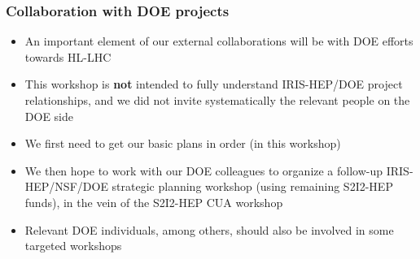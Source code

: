 \begin{frame}
\frametitle{Collaboration with DOE projects}

\begin{itemize}
\item An important element of our external collaborations will be with DOE efforts towards HL-LHC
\item This workshop is {\bf not} intended to fully understand IRIS-HEP/DOE project relationships, and we did not invite systematically the relevant people on the DOE side
\item We first need to get our basic plans in order (in this workshop)
\item We then hope to work with our DOE colleagues to organize a follow-up IRIS-HEP/NSF/DOE strategic planning workshop (using remaining S2I2-HEP funds), in the vein of the S2I2-HEP CUA workshop
\item Relevant DOE individuals, among others, should also be involved in some targeted workshops
\end{itemize}

\end{frame}


